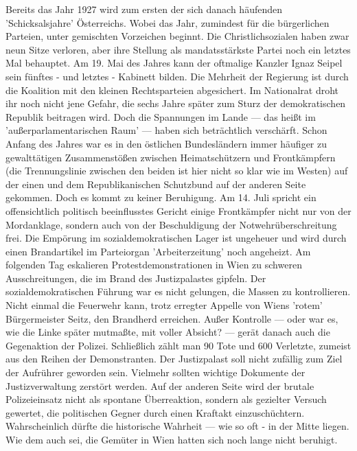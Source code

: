 \documentclass[letterpaper, 12pt]{article}
\begin{document}
Bereits das Jahr 1927 wird zum ersten der sich danach häufenden 'Schicksalsjahre' Österreichs. Wobei das Jahr, zumindest für die bürgerlichen Parteien, unter gemischten Vorzeichen beginnt. Die Christlichsozialen haben zwar neun Sitze verloren, aber ihre Stellung als mandatsstärkste Partei noch ein letztes Mal behauptet. Am 19. Mai des Jahres kann der oftmalige Kanzler Ignaz Seipel sein fünftes - und letztes - Kabinett bilden. Die Mehrheit der Regierung ist durch die Koalition mit den kleinen Rechtsparteien abgesichert. Im Nationalrat droht ihr noch nicht jene Gefahr, die sechs Jahre später zum Sturz der demokratischen Republik beitragen wird. Doch die Spannungen im Lande — das heißt im 'außerparlamentarischen Raum' — haben sich beträchtlich verschärft. Schon
Anfang des Jahres war es in den östlichen Bundesländern immer
häufiger zu gewalttätigen Zusammenstößen zwischen Heimatschützern und Frontkämpfern (die Trennungslinie zwischen den
beiden ist hier nicht so klar wie im Westen) auf der einen und
dem Republikanischen Schutzbund auf der anderen Seite gekommen. Doch es kommt zu keiner Beruhigung. Am 14. Juli spricht ein offensichtlich politisch beeinflusstes Gericht einige Frontkämpfer nicht nur von der Mordanklage, sondern auch von der Beschuldigung der Notwehrüberschreitung frei. Die Empörung im sozialdemokratischen Lager ist ungeheuer und wird durch einen Brandartikel im Parteiorgan 'Arbeiterzeitung' noch angeheizt.
Am folgenden Tag eskalieren Protestdemonstrationen in Wien zu schweren Ausschreitungen, die im Brand des Justizpalastes gipfeln. Der sozialdemokratischen Führung war es nicht gelungen, die Massen zu kontrollieren. Nicht einmal die Feuerwehr kann, trotz erregter Appelle von Wiens 'rotem' Bürgermeister Seitz, den Brandherd erreichen. Außer Kontrolle — oder war es, wie die Linke später mutmaßte, mit voller Absicht? — gerät danach auch die Gegenaktion der Polizei. Schließlich zählt man 90 Tote und 600 Verletzte, zumeist aus den Reihen der Demonstranten. Der Justizpalast soll nicht zufällig zum Ziel der Aufrührer geworden sein. Vielmehr sollten wichtige Dokumente der Justizverwaltung zerstört werden. Auf der anderen Seite wird der brutale Polizeieinsatz nicht als spontane Überreaktion, sondern als gezielter Versuch gewertet, die politischen Gegner durch einen Kraftakt einzuschüchtern. Wahrscheinlich dürfte die historische Wahrheit — wie so oft - in der Mitte liegen. Wie dem auch sei, die Gemüter in Wien hatten sich noch lange nicht beruhigt. \\
\end{document}
